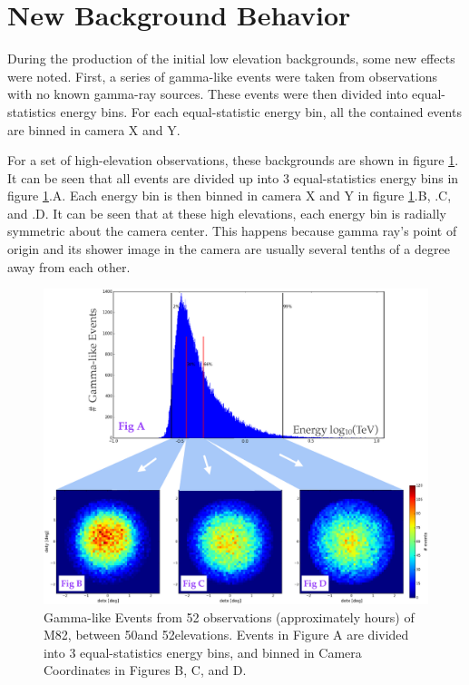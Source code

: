 \section{New Background Behavior}

During the production of the initial low elevation backgrounds, some new effects were noted.
First, a series of gamma-like events were taken from observations with no known gamma-ray sources.
These events were then divided into equal-statistics energy bins.
For each equal-statistic energy bin, all the contained events are binned in camera X and Y.

For a set of high-elevation observations, these backgrounds are shown in figure \ref{fig:back_highelev}.
It can be seen that all events are divided up into 3 equal-statistics energy bins in figure \ref{fig:back_highelev}.A.
Each energy bin is then binned in camera X and Y in figure \ref{fig:back_highelev}.B, .C, and .D.
It can be seen that at these high elevations, each energy bin is radially symmetric about the camera center.
This happens because gamma ray's point of origin and its shower image in the camera are usually several tenths of a degree away from each other.

\begin{figure}[ht]
  \begin{center}
    \includegraphics[width=\textwidth]{images/ctools/backgrounds_highelev.eps}
    \caption[FITS Background at 50\degree Elevation]{Gamma-like Events from 52 observations (approximately  hours) of M82, between 50\degree  and 52\degree  elevations.  Events in Figure A are divided into 3 equal-statistics energy bins, and binned in Camera Coordinates in Figures B, C, and D.}\label{fig:back_highelev}
  \end{center}
\end{figure}

